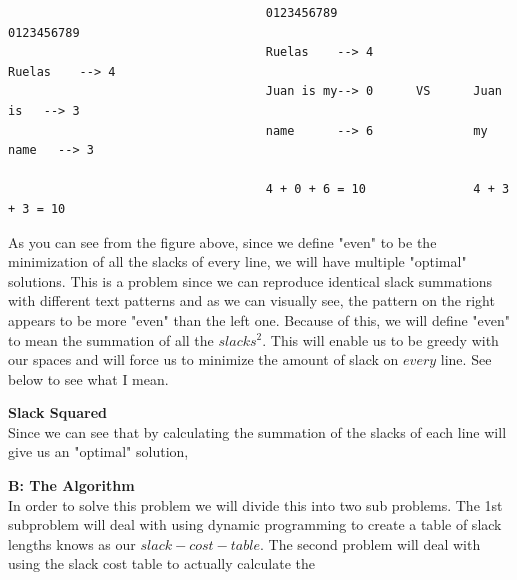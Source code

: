 \documentclass[11pt]{article}
\begin{document}
\begin{solution}
	\hfil
	
		\begin{center}
			\begin{verbatim}
				                    0123456789                   0123456789
				                    Ruelas    --> 4              Ruelas    --> 4
				                    Juan is my--> 0      VS      Juan is   --> 3
				                    name      --> 6              my name   --> 3
				                    
				                    4 + 0 + 6 = 10               4 + 3 + 3 = 10                                     	
			\end{verbatim}				
		\end{center} 
		
		As you can see from the figure above, since we define "even" to be the minimization of all the slacks of every line, we will have multiple "optimal" solutions. This is a problem since we can reproduce identical slack summations with different text patterns and as we can visually see, the pattern on the right appears to be more "even" than the left one. Because of this, we will define "even" to mean the summation of all the $slacks^2$. This will enable us to be greedy with our spaces and will force us to minimize the amount of slack on $every$ line. See below to see what I mean.
		
		\hfil
		
		
		
		
		\hfil 
		
		\textbf{Slack Squared}\\
		
		Since we can see that by calculating the summation of the slacks of each line will give us an  "optimal" solution, 
	
	\hfil
	
	\textbf{B: The Algorithm} \\
	In order to solve this problem we will divide this into two sub problems. The 1st subproblem will deal with using dynamic programming to create a table of slack lengths knows as our $slack-cost-table$. The second problem will deal with using the slack cost table to actually calculate the 
	
		
	
\end{solution}



\begin{solution}
	
\end{solution}
\end{document}
